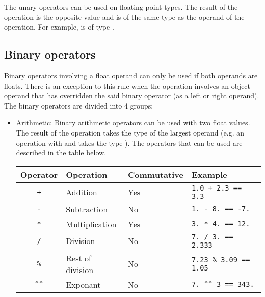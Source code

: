 The \token{-} unary operators can be used on floating point types. The result
of the operation is the opposite value and is of the same type as the operand of
the operation. For example,  is of type .

\subsection{Binary operators}
\label{sec:orga43d13a}

Binary operators involving a float operand can only be used if both operands are
floats. There is an exception to this rule when the operation involves an object
operand that has overridden the said binary operator (as a left or right
operand). The binary operators are divided into 4 groups:

\begin{itemize}
  \setlength\itemsep{-4pt}
\item Arithmetic: Binary arithmetic operators can be used with two float values.
  The result of the operation takes the type of the largest operand (e.g. an
  operation with  and  takes the type ). The
  operators that can be used are described in the table below.

  \begin{center}
    \begin{adjustbox}{max width=1.0\linewidth}
      \begin{tabular}{|c|lll|}
        \hline
        Operator & Operation & Commutative & Example\\[0pt]
        \hline
        \hline
        \texttt{+} & Addition & Yes & \texttt{1.0 + 2.3 == 3.3}\\[0pt]
        \texttt{-} & Subtraction & No & \texttt{1. - 8. == -7.}\\[0pt]
        \texttt{*} & Multiplication & Yes & \texttt{3. * 4. == 12.}\\[0pt]
        \texttt{/} & Division & No & \texttt{7. / 3. == 2.333}\\[0pt]
        \texttt{\%} & Rest of division & No & \texttt{7.23 \% 3.09 == 1.05}\\[0pt]
        \texttt{\textasciicircum{}\textasciicircum{}} & Exponant & No & \texttt{7. \textasciicircum{}\textasciicircum{} 3 == 343.}\\[0pt]
        \hline
      \end{tabular}
    \end{adjustbox}
  \end{center}


\end{itemize}
